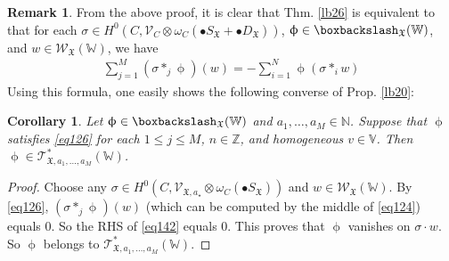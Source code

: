 \documentclass[11pt,b5paper,notitlepage]{article}
\theoremstyle{definition}
\newtheorem{rem}[df]{Remark}
\theoremstyle{plain}
\newtheorem{co}[df]{Corollary}
\newcommand{\fk}{\mathfrak}
\newcommand{\scr}{\mathscr}
\newcommand{\SX}{{S_{\fk X}}}
\newcommand{\DX}{D_{\fk X}}
\newcommand{\blt}{\bullet}
\newcommand{\Vbb}{\mathbb V}
\newcommand{\Wbb}{\mathbb W}
\newcommand{\Nbb}{\mathbb N}
\newcommand{\Zbb}{\mathbb Z}
\newcommand{\<}{\left\langle}
\renewcommand{\>}{\right\rangle}
\newcommand{\fx}{\mathfrak{X}}
\newcommand{\bbs}{\boxbackslash}
\numberwithin{equation}{section}
\begin{document}
\begin{rem}\label{lb64}
From the above proof, it is clear that Thm. \ref{lb26} is equivalent to that for each $\sigma\in H^0(C,\scr V_C\otimes\omega_C(\blt \SX+\blt\DX))$, $\upphi\in\bbs_\fx(\Wbb)$, and $w\in \scr W_\fx(\Wbb)$, we have
\begin{align}
\sum_{j=1}^M (\sigma*_j\upphi)(w)=-\sum_{i=1}^N \upphi(\sigma*_i w)  \label{eq142}
\end{align}
Using this formula, one easily shows the following converse of Prop. \ref{lb20}:
\end{rem}

\begin{co}\label{lb63}
Let $\upphi\in\bbs_\fx(\Wbb)$ and $a_1,\dots,a_M\in\Nbb$. Suppose that $\upphi$ satisfies \eqref{eq126} for each $1\leq j\leq M$, $n\in\Zbb$, and homogeneous $v\in \Vbb$. Then $\upphi\in\scr T_{\fx,a_1,\dots,a_M}^*(\Wbb)$.
\end{co}

\begin{proof}
Choose any $\sigma\in H^0(C,\scr V_{\fx,a_\star}\otimes\omega_C(\blt\SX))$ and $w\in\scr W_\fx(\Wbb)$. By \eqref{eq126}, $(\sigma*_j\upphi)(w)$ (which can be computed by the middle of \eqref{eq124}) equals $0$. So the RHS of \eqref{eq142} equals $0$. This proves that $\upphi$ vanishes on $\sigma\cdot w$. So $\upphi$ belongs to $\scr T_{\fx,a_1,\dots,a_M}^*(\Wbb)$.
\end{proof}
\end{document}
